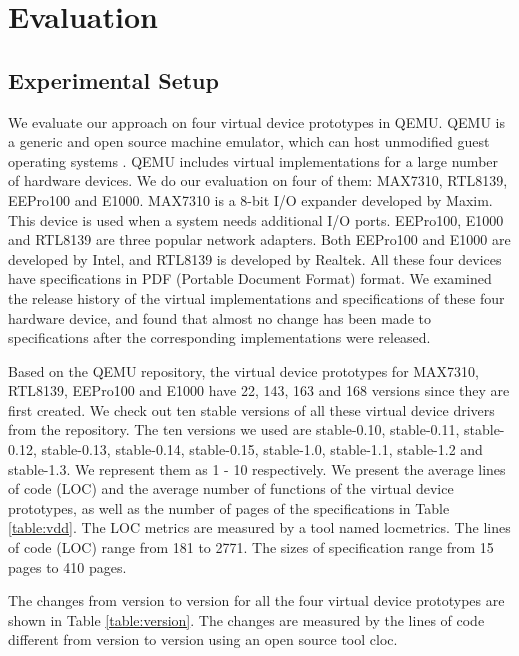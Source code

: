 \section{Evaluation}
\label{sec:evaluation}

\subsection{Experimental Setup}
We evaluate our approach on four virtual device prototypes in QEMU. QEMU is a generic and open source machine emulator, which can host unmodified guest operating systems \cite{bellard_qemuwiki_2013} \cite{bellard_qemu_2005}. QEMU includes virtual implementations for a large number of hardware devices. We do our evaluation on four of them: MAX7310, RTL8139, EEPro100 and E1000. MAX7310 is a 8-bit I/O expander developed by Maxim. This device is used when a system needs additional I/O ports. EEPro100, E1000 and RTL8139 are three popular network adapters. Both EEPro100 and E1000 are developed by Intel, and RTL8139 is developed by Realtek. All these four devices have specifications in PDF (Portable Document Format) format. We examined the release history of the virtual implementations and specifications of these four hardware device, and found that almost no change has been made to specifications after the corresponding implementations were released.

Based on the QEMU repository, the virtual device prototypes for MAX7310, RTL8139, EEPro100 and E1000 have 22, 143, 163 and 168 versions since they are first created. We check out ten stable versions of all these virtual device drivers from the repository.
The ten versions we used are stable-0.10, stable-0.11, stable-0.12, stable-0.13, stable-0.14, stable-0.15, stable-1.0, stable-1.1, stable-1.2 and stable-1.3. We represent them as 1 - 10 respectively.
We present the average lines of code (LOC) and the average number of functions of the virtual device prototypes, as well as the number of pages of the specifications in Table \ref{table:vdd}.
The LOC metrics are measured by a tool named locmetrics.
The lines of code (LOC) range from 181 to 2771. The sizes of specification range from 15 pages to 410 pages.

The changes from version to version for all the four virtual device prototypes are shown in Table \ref{table:version}. The changes are measured by the lines of code different from version to version using an open source tool cloc.


